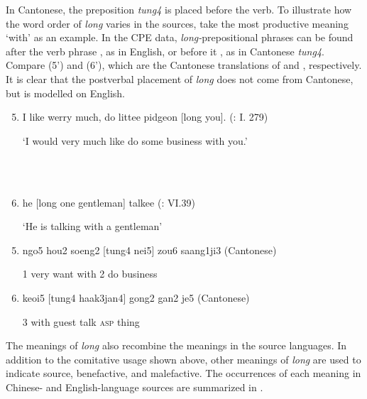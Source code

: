 \documentclass[output=paper]{langsci/langscibook}
\begin{document}
In Cantonese, the preposition \textit{tung4} is placed before the verb. To illustrate how the word order of \textit{long} varies in the sources, take the most productive meaning ‘with’ as an example. In the CPE data, \textit{long-}prepositional phrases can be found after the verb phrase , as in English, or before it , as in Cantonese \textit{tung4}. Compare (5’) and (6’), which are the Cantonese translations of  and , respectively. It is clear that the postverbal placement of \textit{long} does not come from Cantonese, but is modelled on English. 

\ea%
    \label{ex:key:5}
    \begin{enumerate}\setcounter{enumi}{4}\renewcommand{\labelenumi}{$(\theenumi)$}
    \gll\\
        \\
    \glt
    \z

     \item     I like werry much, do littee pidgeon [long you]. (\citealt{downing_fan-qui_1838}: I. 279)

‘I would very much like do some business with you.’ 

\ea%
    \label{ex:key:6}
    \gll\\
        \\
    \glt
    \z

       \item    he [long one gentleman] talkee (\citealt{tong_chinese_1862}: VI.39)

‘He is talking with a gentleman’ 

\end{enumerate}
\begin{enumerate}\setcounter{enumi}{4}\renewcommand{\labelenumi}{$(\theenumi')$}
 \item ngo5  hou2  soeng2   [tung4   nei5]  zou6  saang1ji3 (Cantonese)

1    very   want    with      2    do   business    

 \item keoi5  [tung4    haak3jan4]  gong2   gan2   je5 (Cantonese)

     3  with        guest    talk   \textsc{asp}  thing
     
\end{enumerate}

The meanings of \textit{long} also recombine the meanings in the source languages. In addition to the comitative usage shown above, other meanings of \textit{long} are used to indicate source, benefactive, and malefactive. The occurrences of each meaning in Chinese- and English-language sources are summarized in .
\end{document}
